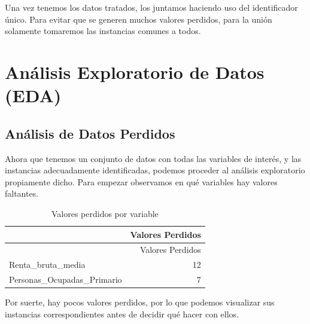 \documentclass[data,article,submit,moreauthors,pdftex]{Definitions/mdpi}
\begin{document}
Una vez tenemos los datos tratados, los juntamos haciendo uso del
identificador único. Para evitar que se generen muchos valores perdidos,
para la unión solamente tomaremos las instancias comunes a todos.

\section{Análisis Exploratorio de Datos
(EDA)}\label{anuxe1lisis-exploratorio-de-datos-eda}

\subsection{Análisis de Datos
Perdidos}\label{anuxe1lisis-de-datos-perdidos}

Ahora que tenemos un conjunto de datos con todas las variables de
interés, y las instancias adecuadamente identificadas, podemos proceder
al análisis exploratorio propiamente dicho. Para empezar observamos en
qué variables hay valores faltantes.

\begin{longtable}[]{@{}lr@{}}
\caption{Valores perdidos por variable}\tabularnewline
\toprule\noalign{}
& Valores Perdidos \\
\midrule\noalign{}
\endfirsthead
\toprule\noalign{}
& Valores Perdidos \\
\midrule\noalign{}
\endhead
\bottomrule\noalign{}
\endlastfoot
Renta\_bruta\_media & 12 \\
Personas\_Ocupadas\_Primario & 7 \\
\end{longtable}

Por suerte, hay pocos valores perdidos, por lo que podemos visualizar
sus instancias correspondientes antes de decidir qué hacer con ellos.
\end{document}
